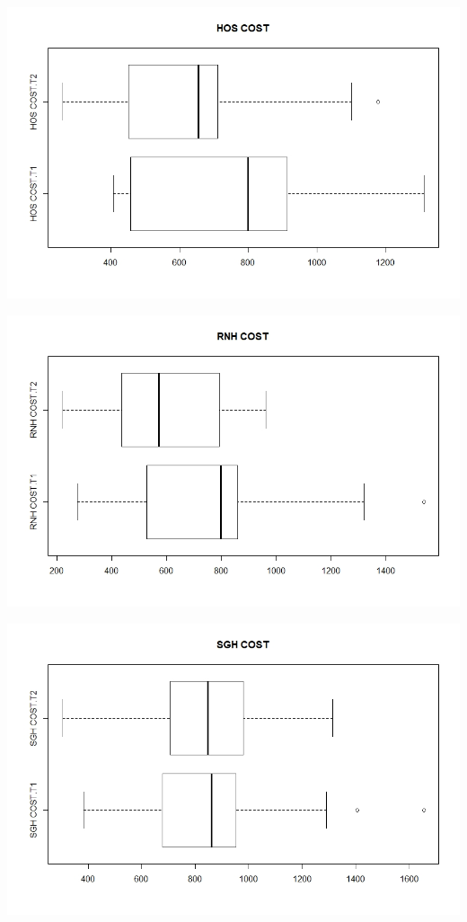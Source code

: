 \documentclass[]{article}
\begin{document}
\centering
\includegraphics[width=\textwidth]{RStudio/jpeg/Box_HOS.jpeg}
\raggedright


\centering
\includegraphics[width=\textwidth]{RStudio/jpeg/Box_RNH.jpeg}
\raggedright


\centering
\includegraphics[width=\textwidth]{RStudio/jpeg/Box_SGH.jpeg}
\raggedright
\end{document}
